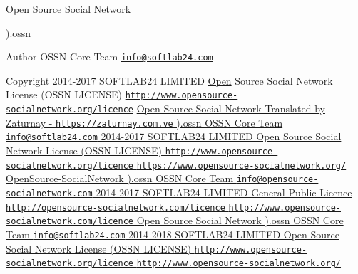\hyperlink{namespace_open}{Open} Source Social Network

).ossn \begin{DoxyAuthor}{Author}
O\+S\+SN Core Team \href{mailto:info@softlab24.com}{\tt info@softlab24.\+com} 
\end{DoxyAuthor}
\begin{DoxyCopyright}{Copyright}
2014-\/2017 S\+O\+F\+T\+L\+A\+B24 L\+I\+M\+I\+T\+ED  \hyperlink{namespace_open}{Open} Source Social Network License (O\+S\+SN L\+I\+C\+E\+N\+SE) \href{http://www.opensource-socialnetwork.org/licence}{\tt http\+://www.\+opensource-\/socialnetwork.\+org/licence} \hyperlink{}{Open Source Social Network Translated by Zaturnay -\/ \href{https://zaturnay.com.ve}{\tt https\+://zaturnay.\+com.\+ve} ).ossn  O\+S\+SN Core Team \href{mailto:info@softlab24.com}{\tt info@softlab24.\+com}  2014-\/2017 S\+O\+F\+T\+L\+A\+B24 L\+I\+M\+I\+T\+ED  Open Source Social Network License (O\+S\+SN L\+I\+C\+E\+N\+SE) \href{http://www.opensource-socialnetwork.org/licence}{\tt http\+://www.\+opensource-\/socialnetwork.\+org/licence}  \href{https://www.opensource-socialnetwork.org/}{\tt https\+://www.\+opensource-\/socialnetwork.\+org/}  Open\+Source-\/\+Social\+Network ).ossn  O\+S\+SN Core Team \href{mailto:info@opensource-socialnetwork.com}{\tt info@opensource-\/socialnetwork.\+com}  2014-\/2017 S\+O\+F\+T\+L\+A\+B24 L\+I\+M\+I\+T\+ED  General Public Licence \href{http://opensource-socialnetwork.com/licence}{\tt http\+://opensource-\/socialnetwork.\+com/licence}  \href{http://www.opensource-socialnetwork.com/licence}{\tt http\+://www.\+opensource-\/socialnetwork.\+com/licence} Open Source Social Network ).ossn  O\+S\+SN Core Team \href{mailto:info@softlab24.com}{\tt info@softlab24.\+com}  2014-\/2018 S\+O\+F\+T\+L\+A\+B24 L\+I\+M\+I\+T\+ED  Open Source Social Network License (O\+S\+SN L\+I\+C\+E\+N\+SE) \href{http://www.opensource-socialnetwork.org/licence}{\tt http\+://www.\+opensource-\/socialnetwork.\+org/licence}  \href{http://www.opensource-socialnetwork.org/}{\tt http\+://www.\+opensource-\/socialnetwork.\+org/} }
\end{DoxyCopyright}
